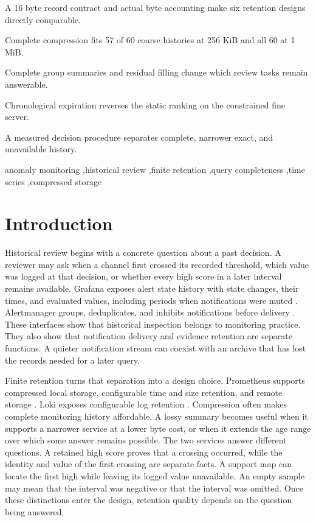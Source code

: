 \documentclass[a4paper,fleqn]{cas-dc}
\begin{document}
\begin{highlights}
\item A 16 byte record contract and actual byte accounting make six retention designs directly comparable.
\item Complete compression fits 57 of 60 coarse histories at 256 KiB and all 60 at 1 MiB.
\item Complete group summaries and residual filling change which review tasks remain answerable.
\item Chronological expiration reverses the static ranking on the constrained fine server.
\item A measured decision procedure separates complete, narrower exact, and unavailable history.
\end{highlights}

\begin{keywords}
anomaly monitoring \sep historical review \sep finite retention \sep query completeness \sep time series \sep compressed storage
\end{keywords}

\maketitle

\section{Introduction}\label{sec:intro}

Historical review begins with a concrete question about a past decision. A reviewer may ask when a channel first crossed its recorded threshold, which value was logged at that decision, or whether every high score in a later interval remains available. Grafana exposes alert state history with state changes, their times, and evaluated values, including periods when notifications were muted \cite{Grafana2026State}. Alertmanager groups, deduplicates, and inhibits notifications before delivery \cite{Prom2026Alertmanager}. These interfaces show that historical inspection belongs to monitoring practice. They also show that notification delivery and evidence retention are separate functions. A quieter notification stream can coexist with an archive that has lost the records needed for a later query.

Finite retention turns that separation into a design choice. Prometheus supports compressed local storage, configurable time and size retention, and remote storage \cite{Prom2026Storage}. Loki exposes configurable log retention \cite{Grafana2026Loki}. Compression often makes complete monitoring history affordable. A lossy summary becomes useful when it supports a narrower service at a lower byte cost, or when it extends the age range over which some answer remains possible. The two services answer different questions. A retained high score proves that a crossing occurred, while the identity and value of the first crossing are separate facts. A support map can locate the first high while leaving its logged value unavailable. An empty sample may mean that the interval was negative or that the interval was omitted. Once these distinctions enter the design, retention quality depends on the question being answered.
\end{document}
